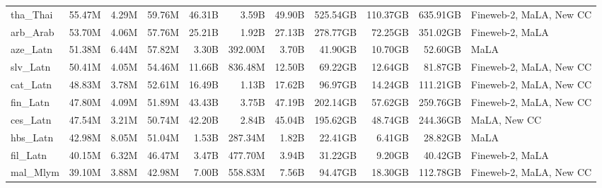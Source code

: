 \begin{table*}[!thp]
{\begin{tabular}{l|rrr|rrr|rrr|l}
tha\_Thai                   & 55.47M     & 4.29M        & 59.76M      & 46.31B       & 3.59B          & 49.90B        & 525.54GB   & 110.37GB     & 635.91GB    & Fineweb-2, MaLA, New CC \\
arb\_Arab                   & 53.70M     & 4.06M        & 57.76M      & 25.21B       & 1.92B          & 27.13B        & 278.77GB   & 72.25GB      & 351.02GB    & Fineweb-2, MaLA         \\
aze\_Latn                   & 51.38M     & 6.44M        & 57.82M      & 3.30B        & 392.00M        & 3.70B         & 41.90GB    & 10.70GB      & 52.60GB     & MaLA                    \\
slv\_Latn                   & 50.41M     & 4.05M        & 54.46M      & 11.66B       & 836.48M        & 12.50B        & 69.22GB    & 12.64GB      & 81.87GB     & Fineweb-2, MaLA, New CC \\
cat\_Latn                   & 48.83M     & 3.78M        & 52.61M      & 16.49B       & 1.13B          & 17.62B        & 96.97GB    & 14.24GB      & 111.21GB    & Fineweb-2, MaLA, New CC \\
fin\_Latn                   & 47.80M     & 4.09M        & 51.89M      & 43.43B       & 3.75B          & 47.19B        & 202.14GB   & 57.62GB      & 259.76GB    & Fineweb-2, MaLA, New CC \\
ces\_Latn                   & 47.54M     & 3.21M        & 50.74M      & 42.20B       & 2.84B          & 45.04B        & 195.62GB   & 48.74GB      & 244.36GB    & MaLA, New CC            \\
hbs\_Latn                   & 42.98M     & 8.05M        & 51.04M      & 1.53B        & 287.34M        & 1.82B         & 22.41GB    & 6.41GB       & 28.82GB     & MaLA                    \\
fil\_Latn                   & 40.15M     & 6.32M        & 46.47M      & 3.47B        & 477.70M        & 3.94B         & 31.22GB    & 9.20GB       & 40.42GB     & Fineweb-2, MaLA         \\
mal\_Mlym                   & 39.10M     & 3.88M        & 42.98M      & 7.00B        & 558.83M        & 7.56B         & 94.47GB    & 18.30GB      & 112.78GB    & Fineweb-2, MaLA, New CC \\

\end{tabular}}
\end{table*}

